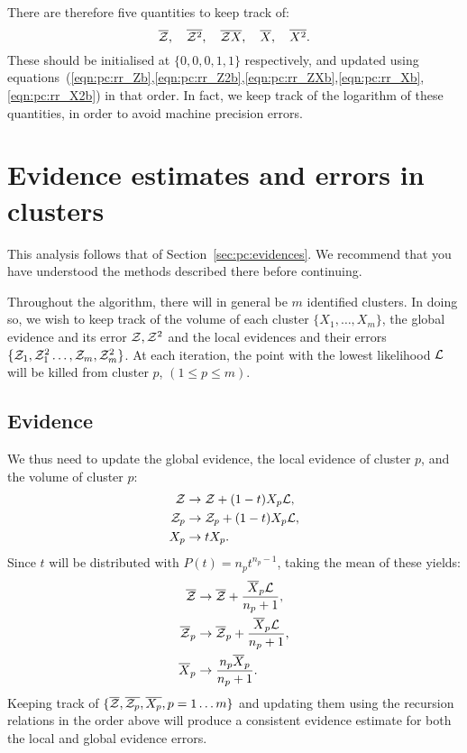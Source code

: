There are therefore five quantities to keep track of: 
\[ \overline{\mathcal{Z}},\quad\overline{\mathcal{Z}^2},\quad\overline{\mathcal{Z} X},\quad \overline{X},\quad\overline{X^2}.\]
These should be initialised at $\{0,0,0,1,1\}$ respectively, and updated using equations~(\ref{eqn:pc:rr_Zb},\ref{eqn:pc:rr_Z2b},\ref{eqn:pc:rr_ZXb},\ref{eqn:pc:rr_Xb},\ref{eqn:pc:rr_X2b}) in that order. In fact, we keep track of the logarithm of these quantities, in order to avoid machine precision errors.





\section{Evidence estimates and errors in clusters}
\label{sec:pc:evidences_clusters}
This analysis follows that of Section~\ref{sec:pc:evidences}. We recommend that you have understood the methods described there before continuing.


Throughout the algorithm, there will in general be $m$ identified clusters. In doing so, we wish to keep track of the volume of each cluster $\{X_1,\ldots,X_m\}$, the global evidence and its error $\mathcal{Z},\mathcal{Z}^2$ and the local evidences and their errors $\{\mathcal{Z}_1,\mathcal{Z}_1^2\ldots,\mathcal{Z}_m,\mathcal{Z}_m^2\}$. At each iteration, the point with the lowest likelihood $\mathcal{L}$ will be killed from cluster $p$, ${(1\le p\le m)}$. 


\subsection{Evidence}
\label{sec:pc:cluster_ev}

We thus need to update the global evidence, the local evidence of cluster $p$, and the volume of cluster $p$:
%
\begin{align}
  \mathcal{Z} &\to \mathcal{Z} + (1-t)X_p\mathcal{L},
  \label{eqn:pc:rr_ev}\\
  \mathcal{Z}_p &\to \mathcal{Z}_p + (1-t)X_p\mathcal{L},
  \label{eqn:pc:rr_evi}\\
  X_p &\to t X_p.
  \label{eqn:pc:rr_Xi}
\end{align}
%
Since $t$ will be distributed with $P(t) = n_p t^{n_p-1}$,
taking the mean of these yields:
%
\begin{align}
  \overline{\mathcal{Z}} &\to \overline{\mathcal{Z}} + \frac{\overline X_p \mathcal{L}}{n_p+1},\\
  \overline{\mathcal{Z}}_p &\to \overline{\mathcal{Z}}_p + \frac{\overline X_p \mathcal{L}}{n_p+1},\\
  \overline X_p &\to \frac{n_p\overline X_p }{n_p+1}. 
\end{align}
%
Keeping track of $\{\overline{\mathcal{Z}},\overline{\mathcal{Z}_p},\overline{X_p},p=1\ldots m\}$ and updating them using the recursion relations in the order above will produce a consistent evidence estimate for both the local and global evidence errors.


